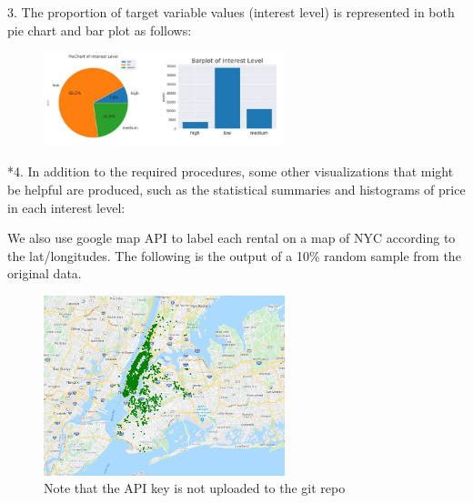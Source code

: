 \documentclass[10pt,twocolumn,letterpaper]{article}
\begin{document}
\clearpage

3. The proportion of target variable values (interest level) is represented in both pie chart and bar plot as follows:



\begin{figure}[h!]
    \centering
    \includegraphics[width=7cm]{CMPT459_pair2.png}
    \caption{}
    \label{fig:galaxy}
\end{figure}


*4. In addition to the required procedures, some other visualizations that might be helpful are produced, such as the statistical summaries and histograms of price in each interest level:  


\begin{figure}[h!]%
    \centering
    \qquad
    \caption{}%
    \label{fig:example}%
\end{figure}


We also use google map API to label each rental on a map of NYC according to the lat/longitudes. The following is the output of a 10\% random sample from the original data. 


\begin{figure}[h!]
    \centering
    \includegraphics[width=7cm]{rents_sample.png}
    \caption{Note that the API key is not uploaded to the git repo}
    \label{fig:galaxy}
\end{figure}
\end{document}

